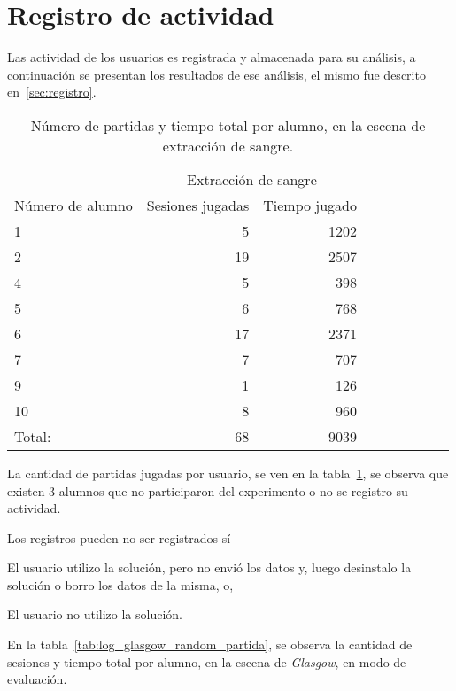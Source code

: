\section{Registro de actividad}

Las actividad de los usuarios es registrada y almacenada para su análisis, a
continuación se presentan los resultados de ese análisis, el mismo fue descrito
en~\ref{sec:registro}.


\begin{table}[!hbt]
\centering
\begin{tabular}{lrrrrrrrr}
\toprule
                   & \multicolumn{2}{c}{Extracción de sangre} \\
                   \cmidrule(lr){2-3} 
Número de alumno   & Sesiones jugadas                            & Tiempo jugado \\
\midrule
 1       & 5  & 1202 \\
 2       & 19 & 2507 \\
 4       & 5  & 398  \\
 5       & 6  & 768  \\
 6       & 17 & 2371 \\
 7       & 7  & 707  \\
 9       & 1  & 126  \\
10       & 8  & 960  \\
\midrule
Total:   & 68 & 9039 \\
\bottomrule
\end{tabular}
\caption{Número de partidas y tiempo total por alumno, en la escena de
    extracción de sangre.}
\label{tab:log_hemocultivo_partida}
\end{table}

La cantidad de partidas jugadas por usuario, se ven en la
tabla~\ref{tab:log_hemocultivo_partida}, se observa que existen 3 alumnos que no
participaron del experimento o no se registro su actividad.

Los registros pueden no ser registrados sí
\begin{enumerate*}[label=\itshape\alph*\upshape)]
    \item El usuario utilizo la solución, pero no envió los datos y, luego
        desinstalo la solución o borro los datos de la misma, o,
    \item El usuario no utilizo la solución.
\end{enumerate*}

En la tabla~\ref{tab:log_glasgow_random_partida}, se observa la cantidad de
sesiones y tiempo total por alumno, en la escena de \textit{Glasgow}, en modo de
evaluación.

